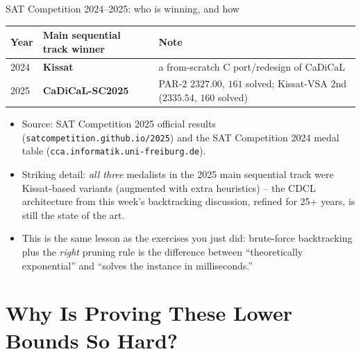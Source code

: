 \documentclass[11pt,aspectratio=169]{beamer}
\begin{document}
\begin{frame}{SAT Competition 2024--2025: who is winning, and how}
  \small
  \begin{center}
  \begin{tabular}{@{}l l p{5.4cm}@{}}
    \toprule
    Year & Main sequential track winner & Note \\
    \midrule
    2024 & \textbf{Kissat} & a from-scratch C port/redesign of CaDiCaL \\
    2025 & \textbf{CaDiCaL-SC2025} & PAR-2 $2327.00$, $161$ solved; Kissat-VSA 2nd
    ($2335.54$, $160$ solved) \\
    \bottomrule
  \end{tabular}
  \end{center}
  \begin{itemize}
    \item Source: SAT Competition 2025 official results
    (\texttt{satcompetition.github.io/2025}) and the SAT Competition 2024 medal table
    (\texttt{cca.informatik.uni-freiburg.de}).
    \item Striking detail: \emph{all three} medalists in the 2025 main sequential track
    were Kissat-based variants (augmented with extra heuristics) -- the CDCL
    architecture from this week's backtracking discussion, refined for 25+ years, is
    still the state of the art.
    \item This is the same lesson as the exercises you just did: brute-force
    backtracking plus the \emph{right} pruning rule is the difference between
    ``theoretically exponential'' and ``solves the instance in milliseconds.''
  \end{itemize}
\end{frame}

\section{Why Is Proving These Lower Bounds So Hard?}
\end{document}

